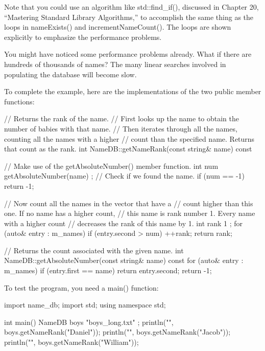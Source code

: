 Note that you could use an algorithm like std::find\_if(), discussed in Chapter 20, “Mastering Standard Library Algorithms,” to accomplish the same thing as the loops in nameExists() and incrementNameCount(). The loops are shown explicitly to emphasize the performance problems.

You might have noticed some performance problems already. What if there are hundreds of thousands of names? The many linear searches involved in populating the database will become slow.

To complete the example, here are the implementations of the two public member functions:

\begin{cpp}
// Returns the rank of the name.
// First looks up the name to obtain the number of babies with that name.
// Then iterates through all the names, counting all the names with a higher
// count than the specified name. Returns that count as the rank.
int NameDB::getNameRank(const string& name) const
{
    // Make use of the getAbsoluteNumber() member function.
    int num { getAbsoluteNumber(name) };
    // Check if we found the name.
    if (num == -1) {
        return -1;
    }

    // Now count all the names in the vector that have a
    // count higher than this one. If no name has a higher count,
    // this name is rank number 1. Every name with a higher count
    // decreases the rank of this name by 1.
    int rank { 1 };
    for (auto& entry : m_names) {
        if (entry.second > num) {
            ++rank;
        }
    }
    return rank;
}

// Returns the count associated with the given name.
int NameDB::getAbsoluteNumber(const string& name) const
{
    for (auto& entry : m_names) {
        if (entry.first == name) {
            return entry.second;
        }
    }
    return -1;
}
\end{cpp}


To test the program, you need a main() function:

\begin{cpp}
import name_db;
import std;
using namespace std;

int main()
{
    NameDB boys { "boys_long.txt" };
    println("{}", boys.getNameRank("Daniel"));
    println("{}", boys.getNameRank("Jacob"));
    println("{}", boys.getNameRank("William"));
}
\end{cpp}

